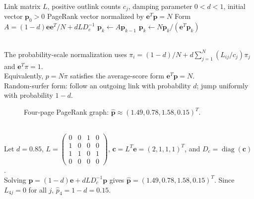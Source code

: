 \begin{breakablealgorithm}
\caption{PageRank by Power Iteration}
\label{alg:sl-pagerank-power-iteration}
\begin{algorithmic}
\Require Link matrix $L$, positive outlink counts $c_j$, damping parameter $0<d<1$, initial vector $\mathbf{p}_0>0$
\Ensure PageRank vector normalized by $\mathbf{e}^T\mathbf{p}=N$
\State Form $A=(1-d)\mathbf{e}\mathbf{e}^T/N+dLD_c^{-1}$
\Repeat
\State $\mathbf{p}_k\gets A\mathbf{p}_{k-1}$
\State $\mathbf{p}_k\gets N\mathbf{p}_k/(\mathbf{e}^T\mathbf{p}_k)$
\end{algorithmic}
\end{breakablealgorithm}

\begin{remark} \label{rem:sl-pagerank-random-surfer-normalization} \\
The probability-scale normalization uses $\pi_i=(1-d)/N+d\sum\limits_{j=1}^N(L_{ij}/c_j)\pi_j$ and $\mathbf{e}^T\pi=1$.\\
Equivalently, $p=N\pi$ satisfies the average-score form $\mathbf{e}^T\mathbf{p}=N$.\\
Random-surfer form: follow an outgoing link with probability $d$; jump uniformly with probability $1-d$.
\end{remark}

\begin{figure}[H]
\centering

\caption{Four-page PageRank graph: $\widehat{\mathbf p}\approx(1.49,0.78,1.58,0.15)^T$.}
\label{fig:sl-pagerank-four-page-network}
\end{figure}

\begin{example} \label{ex:sl-pagerank-four-page-network} \\
Let $d=0.85$, $L=\left(\begin{smallmatrix}0&0&1&0\\1&0&0&0\\1&1&0&1\\0&0&0&0\end{smallmatrix}\right)$, $\mathbf{c}=L^T\mathbf{e}=(2,1,1,1)^T$, and $D_c=\operatorname{diag}(\mathbf{c})$.\\
Solving $\mathbf{p}=(1-d)\mathbf{e}+dLD_c^{-1}\mathbf{p}$ gives $\widehat{\mathbf{p}}=(1.49,0.78,1.58,0.15)^T$. Since $L_{4j}=0$ for all $j$, $\widehat p_4=1-d=0.15$.
\end{example}
